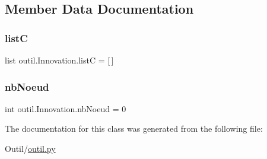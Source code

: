 \subsection{Member Data Documentation}
\mbox{\label{classoutil_1_1_innovation_adbf19c50b8c62928eaf5c364cad9afba}} 
\subsubsection{\texorpdfstring{listC}{listC}}
{\footnotesize\ttfamily list outil.\+Innovation.\+listC = \mbox{[}$\,$\mbox{]}\hspace{0.3cm}{\ttfamily [static]}}

\mbox{\label{classoutil_1_1_innovation_a51c71af8c3246b01cff5c2140ca8b7ba}} 
\subsubsection{\texorpdfstring{nb\+Noeud}{nbNoeud}}
{\footnotesize\ttfamily int outil.\+Innovation.\+nb\+Noeud = 0\hspace{0.3cm}{\ttfamily [static]}}



The documentation for this class was generated from the following file\+:\begin{DoxyCompactItemize}
\item 
Outil/\hyperlink{outil_8py}{outil.\+py}\end{DoxyCompactItemize}
